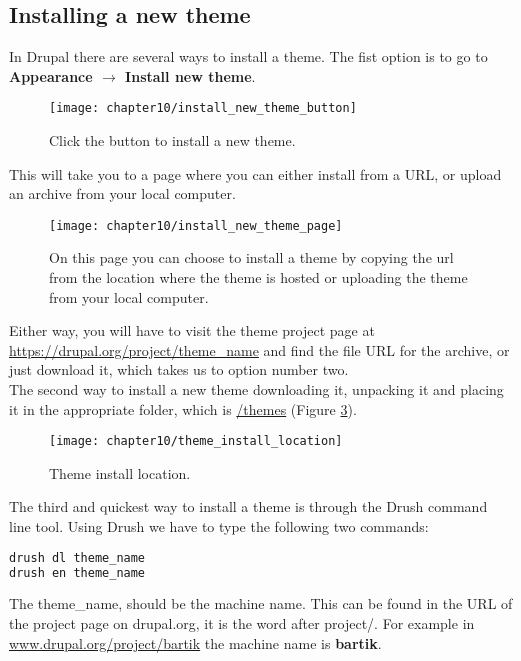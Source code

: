 \subsection{Installing a new theme}

In Drupal there are several ways to install a theme. The fist option is to go to \textbf{Appearance $\rightarrow$ Install new theme}. 

\begin{figure}[H]
	\centering
	\texttt{[image: chapter10/install\_new\_theme\_button]}
	\caption{Click the button to install a new theme.}
	\label{fig:install_new_theme_button}
\end{figure}

This will take you to a page where you can either install from a URL, or upload an archive from your local computer.

\begin{figure}[H]
	\centering
	\texttt{[image: chapter10/install\_new\_theme\_page]}
	\caption{On this page you can choose to install a theme by copying the url from the location where the theme is hosted or uploading the theme from your local computer.}
	\label{fig:install_new_theme_page}
\end{figure}

Either way, you will have to visit the theme project page at \url{https://drupal.org/project/theme_name} and find the file URL for the archive, or just download it, which takes us to option number two.\\

The second way to install a new theme downloading it, unpacking it and placing it in the appropriate folder, which is \url{/themes} (Figure \ref{fig:theme_install_location}). 

\begin{figure}[H]
	\centering
	\texttt{[image: chapter10/theme\_install\_location]}
	\caption{Theme install location.}
	\label{fig:theme_install_location}
\end{figure}

The third and quickest way to install a theme is through the Drush command line tool. Using Drush we have to type the following two commands:

\begin{lstlisting}[language=bash]
drush dl theme_name
drush en theme_name
\end{lstlisting}

The theme\_name, should be the machine name. This can be found in the URL of the project page on drupal.org, it is the word after project/. For example in \url{www.drupal.org/project/bartik} the machine name is \textbf{bartik}.

